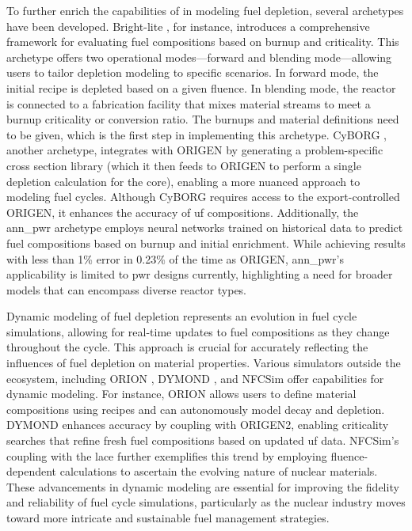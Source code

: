To further enrich the capabilities of \cyclus in modeling fuel depletion,
several archetypes have been developed. Bright-lite
\cite{schneider_integrated_2016}, for instance, introduces a comprehensive
framework for evaluating fuel compositions based on burnup and criticality.
This archetype offers two operational modes—forward and blending mode—allowing
users to tailor depletion modeling to specific scenarios. In forward mode, the
initial recipe is depleted based on a given fluence. In blending mode, the
reactor is connected to a fabrication facility that mixes material streams to
meet a burnup criticality or conversion ratio. The burnups and material
definitions need to be given, which is the first step in implementing this
archetype. CyBORG \cite{skutnik_cyborg_2016}, another \cyclus archetype,
integrates \cyclus with ORIGEN by generating a problem-specific cross section
library (which it then feeds to ORIGEN to perform a single depletion
calculation for the core), enabling a more nuanced approach to modeling fuel
cycles. Although CyBORG requires access to the export-controlled ORIGEN, it
enhances the accuracy of \gls{uf} compositions. Additionally, the
ann\_pwr \cite{bae_deep_2020} archetype employs neural networks trained on
historical data to predict fuel compositions based on burnup and initial
enrichment. While achieving results with less than 1\% error in 0.23\% of the
time as ORIGEN, ann\_pwr's applicability is limited to \gls{pwr} designs
currently, highlighting a need for broader models that can encompass diverse
reactor types.

Dynamic modeling of fuel depletion represents an evolution in fuel cycle
simulations, allowing for real-time updates to fuel compositions as they change
throughout the cycle. This approach is crucial for accurately reflecting the
influences of fuel depletion on material properties. Various simulators outside
the \cyclus ecosystem, including ORION \cite{feng_standardized_2016}, DYMOND
\cite{richards_application_2021}, and NFCSim \cite{schneider_nfcsim_2005}
offer capabilities for dynamic modeling. For instance, ORION allows users to
define material compositions using recipes and can autonomously model decay and
depletion. DYMOND enhances accuracy by coupling with ORIGEN2, enabling
criticality searches that refine fresh fuel compositions based on updated
\gls{uf} data. NFCSim's coupling with the \gls{lace} further exemplifies this
trend by employing fluence-dependent calculations to ascertain the evolving
nature of nuclear materials. These advancements in dynamic modeling are
essential for improving the fidelity and reliability of fuel cycle simulations,
particularly as the nuclear industry moves toward more intricate and
sustainable fuel management strategies.

